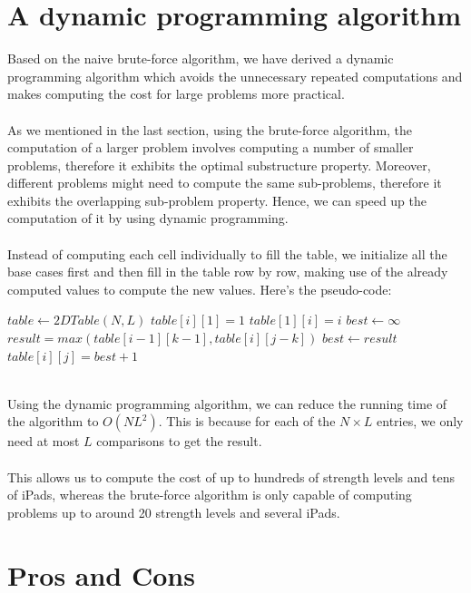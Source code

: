\documentclass[12pt,a4paper,oneside]{report}
\begin{document}
\section{A dynamic programming algorithm}
Based on the naive brute-force algorithm, we have derived a dynamic programming algorithm which avoids the unnecessary repeated computations and makes computing the cost for large problems more practical. \\\\
As we mentioned in the last section, using the brute-force algorithm, the computation of a larger problem involves computing a number of smaller problems, therefore it exhibits the optimal substructure property. Moreover, different problems might need to compute the same sub-problems, therefore it exhibits the overlapping sub-problem property. Hence, we can speed up the computation of it by using dynamic programming. \\\\
Instead of computing each cell individually to fill the table, we initialize all the base cases first and then fill in the table row by row, making use of the already computed values to compute the new values. Here's the pseudo-code:
\begin{algorithm}
\caption{$makeTable(N, L)$}
\begin{algorithmic}[1]
\STATE $table \leftarrow 2DTable(N, L)$
	\STATE $table[i][1] = 1$
\ENDFOR
{}
	\STATE $table[1][i] = i$
\ENDFOR
{}
		\STATE $best \leftarrow \infty$
			\STATE $result = max(table[i - 1][k - 1], table[i][j - k])$
				\STATE $best \leftarrow result$
			\ENDIF
		\ENDFOR
		\STATE $table[i][j] = best + 1$
	\ENDFOR
\ENDFOR
\end{algorithmic}
\end{algorithm}
~\\
Using the dynamic programming algorithm, we can reduce the running time of the algorithm to $O(NL^2)$. This is because for each of the $N \times L$ entries, we only need at most $L$ comparisons to get the result. \\\\
This allows us to compute the cost of up to hundreds of strength levels and tens of iPads, whereas the brute-force algorithm is only capable of computing problems up to around 20 strength levels and several iPads.
\section{Pros and Cons}
\end{document}
